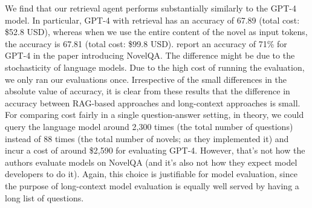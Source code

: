 \documentclass{article}
\begin{document}
We find that our retrieval agent performs substantially similarly to the GPT-4 model. In particular, GPT-4 with retrieval has an accuracy of 67.89 (total cost: \$52.8 USD), whereas when we use the entire content of the novel as input tokens, the accuracy is 67.81 (total cost: \$99.8 USD). \citet{wang_novelqa_2024} report an accuracy of 71\% for GPT-4 in the paper introducing NovelQA. The difference might be due to the stochasticity of language models. Due to the high cost of running the evaluation, we only ran our evaluations once. Irrespective of the small differences in the absolute value of accuracy, it is clear from these results that the difference in accuracy between RAG-based approaches and long-context approaches is small. For comparing cost fairly in a single question-answer setting, in theory, we could query the language model around 2,300 times (the total number of questions) instead of 88 times (the total number of novels; as they implemented it) and incur a cost of around \$2,590 for evaluating GPT-4. However, that's not how the authors evaluate models on NovelQA (and it's also not how they expect model developers to do it). Again, this choice is justifiable for model evaluation, since the purpose of long-context model evaluation is equally well served by having a long list of questions.
\end{document}
